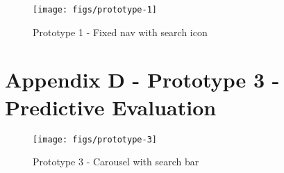 \begin{figure}[H]
  \centering
  \texttt{[image: figs/prototype-1]}
  \caption{Prototype 1 - Fixed nav with search icon}
  \label{fig::1}
\end{figure}

\section{Appendix D - Prototype 3 - Predictive Evaluation}

\begin{figure}[H]
  \centering
  \texttt{[image: figs/prototype-3]}
  \caption{Prototype 3 - Carousel with search bar}
  \label{fig::1}
\end{figure}



